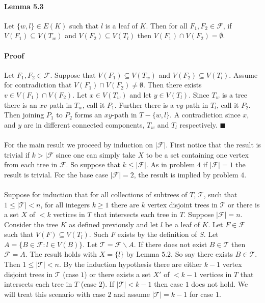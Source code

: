 \documentclass[letterpaper,12pt,oneside,onecolumn]{report}
\begin{document}
\paragraph{Lemma 5.3}
Let $\{w,l\} \in E(K)$ such that $l$ is a leaf of $K$. Then for all $F_1, F_2 \in \mathcal{F}$, if $V(F_1) \subseteq V(T_w)$ and $V(F_2) \subseteq V(T_l)$ then $V(F_1) \cap V(F_2) = \emptyset$.
\paragraph{Proof}
Let $F_1, F_2 \in \mathcal{F}$. Suppose that $V(F_1) \subseteq V(T_w)$ and $V(F_2) \subseteq V(T_l)$. Assume for contradiction that $V(F_1) \cap V(F_2) \neq \emptyset$. Then there exists $v \in V(F_1) \cap V(F_2)$. Let $x \in V(T_w)$ and let $y \in V(T_l)$. Since $T_w$ is a tree there is an $xv$-path in $T_w$, call it $P_1$. Further there is a $vy$-path in $T_l$, call it $P_2$. Then joining $P_1$ to $P_2$ forms an $xy$-path in $T - \{w,l\}$. A contradiction since $x$, and $y$ are in different connected components, $T_w$ and $T_l$ respectively. $\blacksquare$
\paragraph{}
For the main result we proceed by induction on $|\mathcal{F}|$. First notice that the result is trivial if $k > |\mathcal{F}$ since one can simply take $X$ to be a set containing one vertex from each tree in $\mathcal{F}$. So suppose that $k \leq |\mathcal{F}|$. As in problem $4$ if $|\mathcal{F}| = 1$ the result is trivial. For the base case $|\mathcal{F}| = 2$, the result is implied by problem $4$.
\paragraph{}
Suppose for induction that for all collections of subtrees of $T$, $\mathcal{T}$, such that $1 \leq |\mathcal{T}| < n$, for all integers $k \geq 1$ there are $k$ vertex disjoint trees in $\mathcal{T}$ or there is a set $X$ of $<k$ vertices in $T$ that intersects each tree in $T$. Suppose $|\mathcal{F}| = n$. Consider the tree $K$ as defined previously and let $l$ be a leaf of $K$. Let $F \in \mathcal{F}$ such that $V(F) \subseteq V(T_l)$. Such $F$ exists by the definition of $S$. Let $A = \{ B \in \mathcal{F} : l \in V(B)\}$. Let $\mathcal{T} = \mathcal{F} \backslash A$. If there does not exist $B \in \mathcal{T}$ then $\mathcal{F} = A$. The result holds with $X = \{l\}$ by Lemma $5.2$. So say there exists $B \in \mathcal{T}$. Then $1 \leq |\mathcal{T}| < n$. By the induction hypothesis there are either $k-1$ vertex disjoint trees in $\mathcal{T}$ (case $1$) or there exists a set $X'$ of $ < k-1$ vertices in $T$ that intersects each tree in $T$ (case $2$). If $|\mathcal{T}| < k - 1$ then case $1$ does not hold. We will treat this scenario with case $2$ and assume $|\mathcal{T}| = k - 1$ for case $1$.
\end{document}
